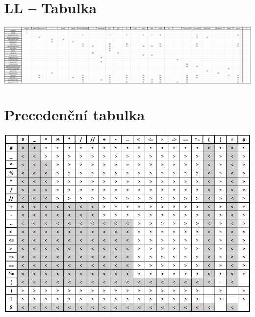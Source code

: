 \documentclass[11pt]{article}
\begin{document}
    \section{LL -- Tabulka}
        \includegraphics[width=1\linewidth]{lltable.png}
        
    \vspace{15mm}
    
    \section{Precedenční tabulka}
        \includegraphics[width=1\linewidth]{precedencni tabulka.png}
        \pagebreak
\end{document}
